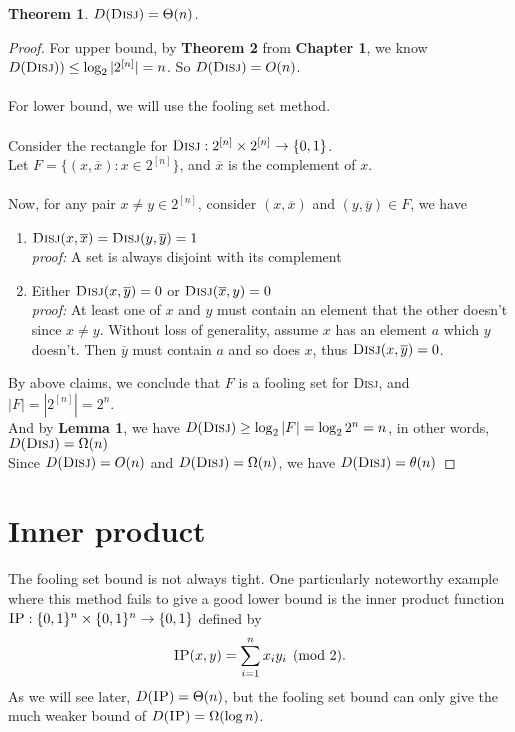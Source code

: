 \documentclass[11pt,oneside]{book}
\theoremstyle{plain}
\newtheorem{theorem}{Theorem}
\theoremstyle{definition}
\theoremstyle{plain}
\newcommand{\Disj}{\textsc{Disj}}
\newcommand{\IP}{\textsc{IP}}
\begin{document}
\begin{theorem}
	$D(\Disj) = \Theta(n)$.
\end{theorem}

\begin{proof}
	For upper bound, by \textbf{Theorem 2} from \textbf{Chapter 1}, we know $D(\Disj)) \leq \log_2 |2^{[n]}| = n$. So $D(\Disj) = O(n)$.\\
	\\
	For lower bound, we will use the fooling set method.\\
	\\
	Consider the rectangle for $\Disj :2^{[n]} \times 2^{[n]} \rightarrow \{0,1\}$.\\
	Let $F = \{(x,\overline{x}): x \in 2^{[n]}\}$, and $\overline{x}$ is the complement of $x$. \\
	\\
	Now, for any pair $x \neq y \in 2^{[n]}$, consider $(x,\overline{x})$ and $(y,\overline{y}) \in F$, we have 
	\begin{enumerate}
		\item $\Disj(x,\overline{x}) = \Disj(y,\overline{y}) = 1$ \\
		\textit{proof:} A set is always disjoint with its complement 
		\item Either $\Disj(x,\overline{y}) = 0$ or $\Disj(\overline{x},y) = 0$ \\
		\textit{proof:} At least one of $x$ and $y$ must contain an element that the other doesn't since $x \neq y$. Without loss of generality, assume $x$ has an element $a$ which $y$ doesn't. Then $\overline{y}$ must contain $a$ and so does $x$, thus $\Disj(x,\overline{y}) = 0$.
	\end{enumerate} 
	By above claims, we conclude that $F$ is a fooling set for \Disj, and $|F| = |2^{[n]}| = 2^n$.\\
	And by \textbf{Lemma 1}, we have $D(\Disj) \ge \log_2 |F| = \log_2 2^n = n$, in other words, $D(\Disj) = \Omega(n)$\\
	Since $D(\Disj) = O(n)$ and $D(\Disj) = \Omega(n)$, we have $D(\Disj) = \theta(n)$
\end{proof}



 \section{Inner product}

The fooling set bound is not always tight. One particularly noteworthy example where this method fails to give a good lower bound is the inner product function  $\IP : \{0,1\}^n \times \{0,1\}^n \to \{0,1\}$ defined by
\[
\IP(x,y) = \sum_{i=1}^n x_i y_i \pmod{2}.
\]
As we will see later, $D(\IP) = \Theta(n)$, but the fooling set bound can only give the much weaker bound of $D(\IP) = \Omega(\log n)$.
\end{document}
